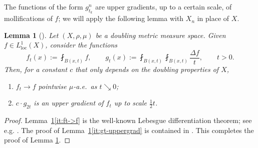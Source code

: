 \documentclass[11pt]{amsart}
\newtheorem{lemma}[theorem]{Lemma}
\theoremstyle{definition}
\theoremstyle{remark}
\numberwithin{equation}{section}
\begin{document}
The functions of the form $g^n_{t_k}$ are upper gradients, up to a certain scale, of
mollifications of $f$; we will apply the following lemma with $X_n$ in place of $X$.

\begin{lemma}[\cite{DMS}]\label{lem:DMS1869}
Let $(X,\rho,\mu)$ be a doubling metric measure space.
Given $f\in L^1_{\mathrm{loc}}(X)$, consider the functions
\begin{equation}\label{eq:ft-gt}
  f_t(x):=\fint_{B(x,t)}f,\qquad
  g_t(x):=\fint_{B(x,t)}\fint_{B(x,t)}\frac{\Delta f}{t},\qquad t>0.
\end{equation}
Then, for a constant $c$ that only depends on the doubling properties of $X$,
\begin{enumerate}[\rm(i)]
  \item\label{it:ft->f} $f_t\to f$ pointwise $\mu$-a.e.\ as $t\searrow 0$;
  \item\label{it:gt-uppergrad} $c\cdot g_{2t}$ is an upper gradient of $f_t$ up to scale
  $\frac12 t$.
\end{enumerate}
\end{lemma}

\begin{proof}
Lemma~\ref{lem:DMS1869}\eqref{it:ft->f} is the well-known Lebesgue differentiation theorem;
see e.g. \cite[Theorem 1.8]{Heinonen:book}. The proof of
Lemma~\ref{lem:DMS1869}\eqref{it:gt-uppergrad} is contained in \cite[page 1869]{DMS}.
This completes the proof of Lemma \ref{lem:DMS1869}.
\end{proof}
\end{document}
